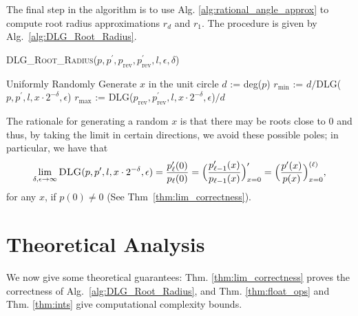 \documentclass[runningheads]{llncs}
\begin{document}
The final step in the algorithm is to use Alg. \ref{alg:rational_angle_approx} to compute root radius approximations $r_d$ and $r_1$.
The procedure is given by Alg.~\ref{alg:DLG_Root_Radius}.
\begin{algorithm}
\caption{\textsc{DLG\_Root\_Radius}($p,p^\prime,p_\mathrm{rev},p^\prime_\mathrm{rev},l, \epsilon, \delta $)}
\label{alg:DLG_Root_Radius}
\begin{algorithmic}
\STATE Uniformly Randomly Generate $x $ in the unit circle
\STATE $d$ := deg($p$)
\STATE $r_\mathrm{min} $ := $d/$\textsc{DLG}($p,p^\prime ,l,x\cdot 2^{-\delta}, \epsilon $)
\STATE $r_\mathrm{max} $ := \textsc{DLG}($p_\mathrm{rev},p^\prime _\mathrm{rev},l,x\cdot 2^{-\delta}, \epsilon$)$/d$
\end{algorithmic}
\end{algorithm}
The rationale for generating a random $x$ is that there may be roots close to 0 and thus, by taking the limit in certain directions, we avoid these possible poles; in particular, we have that
\begin{equation}\label{eq:lim_DLG}
  \lim_{ \delta,\epsilon \to \infty }  \textsc{DLG}(p,p^\prime ,l,x\cdot 2^{-\delta}, \epsilon ) = \frac{p_{{\ell}}'(0)}{p_{\ell}(0)}=\Big(\frac{p_{\ell-1}'(x)}{p_{\ell-1}(x)}\Big)_{x=0}'=\Big(\frac{p'(x)}{p(x)}\Big)_{x=0}^{(\ell)},
\end{equation}
for any $x$, if $p(0) \neq 0$ (See Thm~\ref{thm:lim_correctness}).





\section{Theoretical Analysis}
\label{sec:the_ana}
We now give some theoretical guarantees: Thm. \ref{thm:lim_correctness} proves the correctness of Alg.~\ref{alg:DLG_Root_Radius}, and Thm. \ref{thm:float_ops} and Thm. \ref{thm:ints} give computational complexity bounds.
\end{document}
